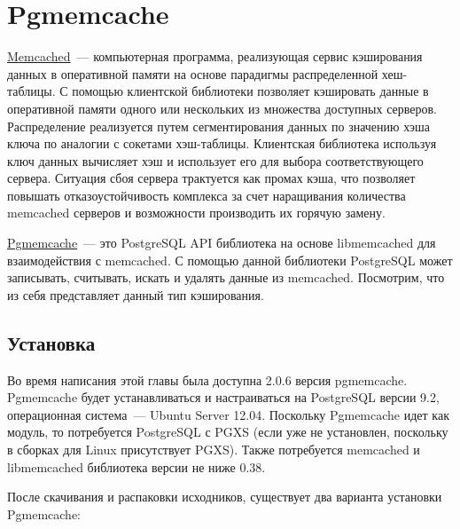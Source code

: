 \section{Pgmemcache}
\label{sec:pgmemcache}

\href{http://memcached.org/}{Memcached}~--- компьютерная программа, реализующая сервис кэширования данных в оперативной памяти на основе парадигмы распределенной хеш-таблицы. С помощью клиентской библиотеки позволяет кэшировать данные в оперативной памяти одного или нескольких из множества доступных серверов. Распределение реализуется путем сегментирования данных по значению хэша ключа по аналогии с сокетами хэш-таблицы. Клиентская библиотека используя ключ данных вычисляет хэш и использует его для выбора соответствующего сервера. Ситуация сбоя сервера трактуется как промах кэша, что позволяет повышать отказоустойчивость комплекса за счет наращивания количества memcached серверов и возможности производить их горячую замену.

\href{http://pgfoundry.org/projects/pgmemcache/}{Pgmemcache}~--- это PostgreSQL API библиотека на основе libmemcached для взаимодействия с memcached. С помощью данной библиотеки PostgreSQL может записывать, считывать, искать и удалять данные из memcached. Посмотрим, что из себя представляет данный тип кэширования.


\subsection{Установка}

Во время написания этой главы была доступна 2.0.6 версия pgmemcache. Pgmemcache будет устанавливаться и настраиваться на PostgreSQL версии 9.2, операционная система~--- Ubuntu Server 12.04. Поскольку Pgmemcache идет как модуль, то потребуется PostgreSQL с PGXS (если уже не установлен, поскольку в сборках для Linux присутствует PGXS). Также потребуется memcached и libmemcached библиотека версии не ниже 0.38.

После скачивания и распаковки исходников, существует два варианта установки Pgmemcache:


